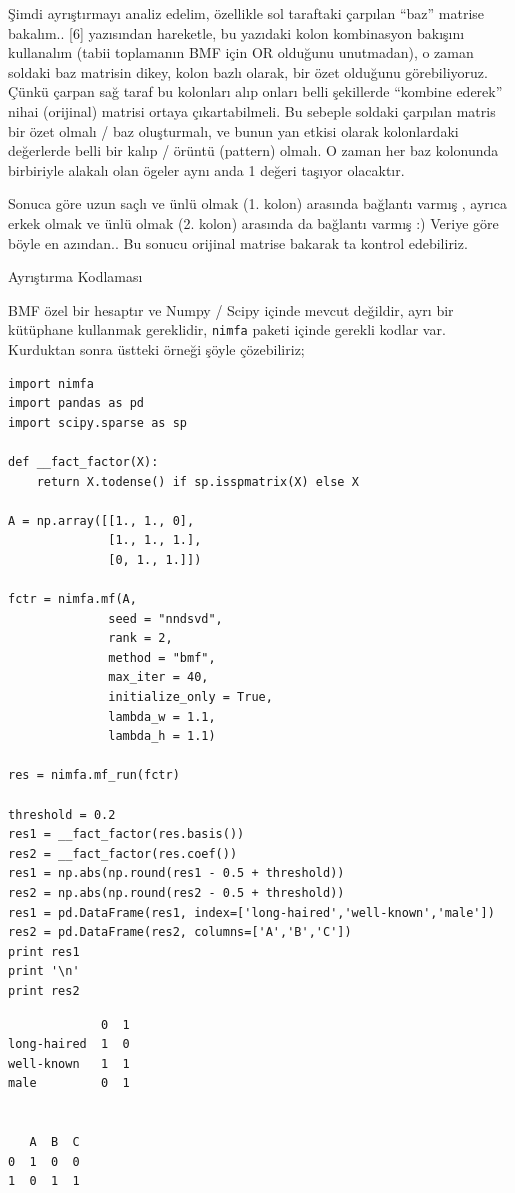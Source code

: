 \documentclass[12pt,fleqn]{article}\usepackage{../../common}
\begin{document}
Şimdi ayrıştırmayı analiz edelim, özellikle sol taraftaki çarpılan ``baz''
matrise bakalım.. [6] yazısından hareketle, bu yazıdaki kolon kombinasyon
bakışını kullanalım (tabii toplamanın BMF için OR olduğunu unutmadan), o
zaman soldaki baz matrisin dikey, kolon bazlı olarak, bir özet olduğunu
görebiliyoruz. Çünkü çarpan sağ taraf bu kolonları alıp onları belli
şekillerde ``kombine ederek'' nihai (orijinal) matrisi ortaya
çıkartabilmeli. Bu sebeple soldaki çarpılan matris bir özet olmalı / baz
oluşturmalı, ve bunun yan etkisi olarak kolonlardaki değerlerde belli bir
kalıp / örüntü (pattern) olmalı. O zaman her baz kolonunda birbiriyle
alakalı olan ögeler aynı anda 1 değeri taşıyor olacaktır.

Sonuca göre uzun saçlı ve ünlü olmak (1. kolon) arasında bağlantı varmış ,
ayrıca erkek olmak ve ünlü olmak (2. kolon) arasında da bağlantı varmış :)
Veriye göre böyle en azından.. Bu sonucu orijinal matrise bakarak ta
kontrol edebiliriz.

Ayrıştırma Kodlaması 

BMF özel bir hesaptır ve Numpy / Scipy içinde mevcut değildir, ayrı bir
kütüphane kullanmak gereklidir, \verb!nimfa! paketi içinde gerekli kodlar
var. Kurduktan sonra üstteki örneği şöyle çözebiliriz;

\begin{verbatim}
import nimfa
import pandas as pd
import scipy.sparse as sp

def __fact_factor(X):
    return X.todense() if sp.isspmatrix(X) else X

A = np.array([[1., 1., 0],
              [1., 1., 1.],
              [0, 1., 1.]])

fctr = nimfa.mf(A,
              seed = "nndsvd", 
              rank = 2, 
              method = "bmf", 
              max_iter = 40, 
              initialize_only = True,
              lambda_w = 1.1,
              lambda_h = 1.1)

res = nimfa.mf_run(fctr)

threshold = 0.2
res1 = __fact_factor(res.basis())
res2 = __fact_factor(res.coef())
res1 = np.abs(np.round(res1 - 0.5 + threshold))
res2 = np.abs(np.round(res2 - 0.5 + threshold))
res1 = pd.DataFrame(res1, index=['long-haired','well-known','male'])
res2 = pd.DataFrame(res2, columns=['A','B','C'])
print res1
print '\n'
print res2
\end{verbatim}

\begin{verbatim}
             0  1
long-haired  1  0
well-known   1  1
male         0  1


   A  B  C
0  1  0  0
1  0  1  1
\end{verbatim}
\end{document}
